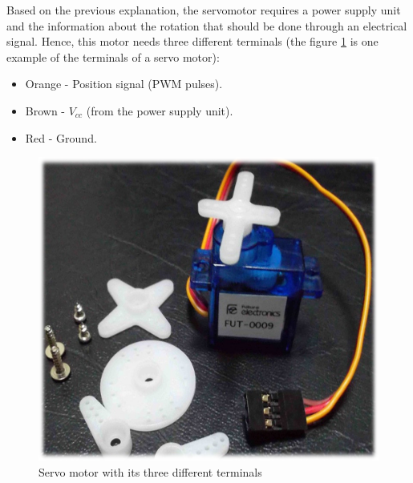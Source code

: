 Based on the previous explanation, the servomotor requires a power supply unit and the information about the rotation that should be done through an electrical signal. Hence, this motor needs three different terminals (the figure \ref{cable_servo} is one example of the terminals of a servo motor):
\begin{itemize}  
        \item Orange - Position signal (PWM pulses).
        \item Brown - $V_{cc}$ (from the power supply unit). 
        \item Red - Ground.
\end{itemize}

\begin{figure}[H]
\centering
\includegraphics[scale=0.5]{figures/cable_servo.png}
\caption{Servo motor with its three different terminals}
\label{cable_servo}
\end{figure}

